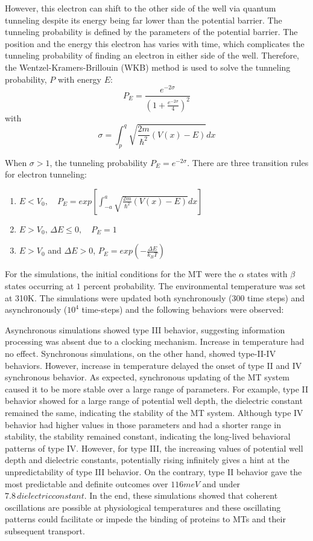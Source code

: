 \documentclass[letterpaper,final,times]{cas-dc}
\numberwithin{equation}{section}
\begin{document}
However, this electron can shift to the other side of the well via quantum tunneling despite its energy being far lower than the potential barrier. The tunneling probability is defined by the parameters of the potential barrier. The position and the energy this electron has varies with time, which complicates the tunneling probability of finding an electron in either side of the well. Therefore, the Wentzel-Kramers-Brillouin (WKB) method is used to solve the tunneling probability, $P$ with energy $E$:
\begin{equation}
    P_E = \frac{e^{-2\sigma}}{(1+\frac{e^{-2\sigma}}{4})^2}
\end{equation}
with
\begin{equation}
\sigma = \int_{p}^{q} \sqrt{\frac{2m}{{\hbar}^2}(V(x)-E)}  dx
\end{equation}

When $\sigma >1$, the tunneling probability $P_E = e^{-2\sigma}$. There are three transition rules for electron tunneling:
\begin{enumerate}
    \item $E<V_0,\quad P_E = exp[\int_{-a}^{a}\sqrt{\frac{2m}{{\hbar}^2}(V(x)-E)} dx]$
    \item $E>V_0, \,  \Delta E\leq0, \quad P_E=1$
    \item $E>V_0$ and $\Delta E>0$, $P_E=exp(-\frac{\Delta E}{k_BT})$
\end{enumerate}


For the simulations, the initial conditions for the MT were the $\alpha$ states with $\beta$ states occurring at $1$ percent probability. The environmental temperature was set at 310K. The simulations were updated both synchronously (300 time steps) and asynchronously ($10^4$ time-steps) and the following behaviors were observed:

Asynchronous simulations showed type III behavior, suggesting information processing was absent due to a clocking mechanism. Increase in temperature had no effect. Synchronous simulations, on the other hand, showed type-II-IV behaviors. However, increase in temperature delayed the onset of type II and IV synchronous behavior. As expected, synchronous updating of the MT system caused it to be more stable over a large range of parameters. For example, type II behavior showed for a large range of potential well depth, the dielectric constant remained the same, indicating the stability of  the MT system. Although type IV behavior had higher values in those parameters and had a shorter range in stability, the stability
remained constant, indicating the long-lived behavioral patterns of type IV. However, for type III, the increasing values of potential well depth and dielectric constants, potentially rising infinitely gives a hint at the unpredictability of type III behavior. On the contrary, type II behavior gave the most predictable and definite outcomes over $116meV$ and under $7.8 \,dielectric constant$. In the end, these simulations showed that coherent oscillations are possible at physiological temperatures and these oscillating patterns could facilitate or impede the binding of proteins to MTs and their subsequent transport.
\end{document}
